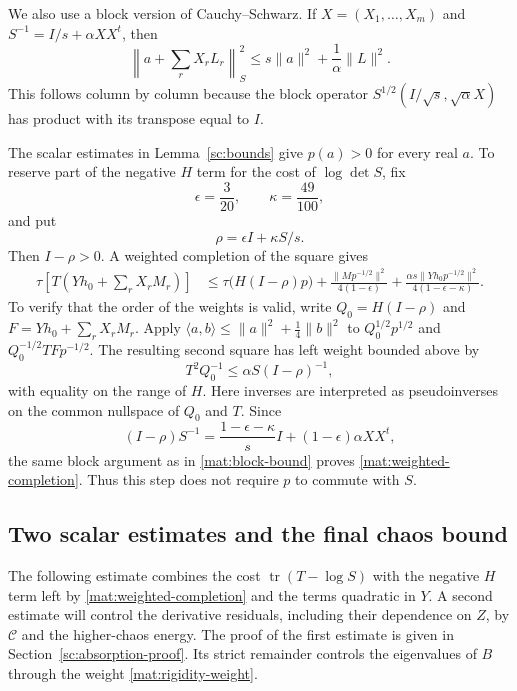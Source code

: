 \documentclass[11pt]{article}
\theoremstyle{definition}
\theoremstyle{remark}
\numberwithin{equation}{section}
\begin{document}
We also use a block version of Cauchy--Schwarz.  If
$X=(X_1,\ldots,X_m)$ and $S^{-1}=I/s+\alpha XX^t$, then
\begin{equation}\label{mat:block-bound}
 \left\|a+\sum_rX_rL_r\right\|_S^2
 \le s\|a\|^2+\frac1\alpha\|L\|^2.
\end{equation}
This follows column by column because the block operator
$S^{1/2}(I/\sqrt{s},\sqrt{\alpha}X)$ has product with its transpose
equal to $I$.

The scalar estimates in Lemma~\ref{sc:bounds} give $p(a)>0$ for every
real $a$.  To reserve part of the negative $H$ term for the cost of
$\log\det S$, fix
\begin{equation}\label{mat:completion-constants}
 \epsilon=\frac3{20},\qquad\kappa=\frac{49}{100},
\end{equation}
and put
\[
 \rho=\epsilon I+\kappa S/s.
\]
Then $I-\rho>0$.  A weighted completion of the square gives
\begin{align}
 \tau\left[T\left(Yh_0+\sum_rX_rM_r\right)\right]
 &\le\tau\bigl(H(I-\rho)p\bigr)
       +\frac{\|M p^{-1/2}\|^2}{4(1-\epsilon)}
       +\frac{\alpha s\|Yh_0p^{-1/2}\|^2}
                    {4(1-\epsilon-\kappa)}.
 \label{mat:weighted-completion}
\end{align}
To verify that the order of the weights is valid, write
$Q_0=H(I-\rho)$ and $F=Yh_0+\sum_rX_rM_r$.
Apply $\langle a,b\rangle\le\|a\|^2+\frac14\|b\|^2$ to
$Q_0^{1/2}p^{1/2}$ and $Q_0^{-1/2}TFp^{-1/2}$.
The resulting second square has left weight bounded above by
\[
 T^2Q_0^{-1}\le\alpha S(I-\rho)^{-1},
\]
with equality on the range of $H$.  Here inverses are interpreted as
pseudoinverses on the common nullspace of $Q_0$ and $T$.
Since
\[
 (I-\rho)S^{-1}
   =\frac{1-\epsilon-\kappa}{s}I
           +(1-\epsilon)\alpha XX^t,
\]
the same block argument as in \eqref{mat:block-bound} proves
\eqref{mat:weighted-completion}.  Thus this step does not require $p$
to commute with $S$.

\subsection{Two scalar estimates and the final chaos bound}

The following estimate combines the cost $\operatorname{tr}(T-\log S)$ with the
negative $H$ term left by \eqref{mat:weighted-completion} and the
terms quadratic in $Y$.  A second estimate will control the derivative
residuals, including their dependence on $Z$, by $\mathcal C$ and the
higher-chaos energy.  The proof of the first estimate is given in
Section~\ref{sc:absorption-proof}.  Its strict remainder controls the
eigenvalues of $B$ through the weight \eqref{mat:rigidity-weight}.
\end{document}

